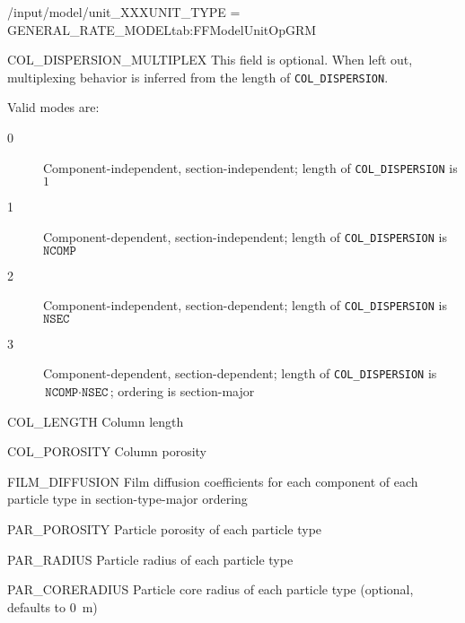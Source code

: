 \begin{condsubgroup}{/input/model/unit\_XXX}{UNIT\_TYPE = GENERAL\_RATE\_MODEL}{tab:FFModelUnitOpGRM}
\begin{dataset}[unit=--,type=int,range={$\{0, \dots, 3 \}$},length={1}]{COL\_DISPERSION\_MULTIPLEX}
    This field is optional.
    When left out, multiplexing behavior is inferred from the length of \texttt{COL\_DISPERSION}.

    Valid modes are:
    \begin{description}
      \item[0] Component-independent, section-independent; length of \texttt{COL\_DISPERSION} is $1$
      \item[1] Component-dependent, section-independent; length of \texttt{COL\_DISPERSION} is $\texttt{NCOMP}$
      \item[2] Component-independent, section-dependent; length of \texttt{COL\_DISPERSION} is $\texttt{NSEC}$
      \item[3] Component-dependent, section-dependent; length of \texttt{COL\_DISPERSION} is $\texttt{NCOMP} \cdot \texttt{NSEC}$; ordering is section-major
    \end{description}\vspace{-\baselineskip}
  \end{dataset}
  \begin{dataset}[unit=\si{\metre},type=double,range={$> 0$},length={1}]{COL\_LENGTH}
    Column length
  \end{dataset}
  \begin{dataset}[unit=--,type=double,range={$(0,1]$},length={1}]{COL\_POROSITY}
    Column porosity
  \end{dataset}
  \begin{dataset}[unit=\si{\metre\per\second},type=double,range={$\geq 0$},length={$\texttt{NPARTYPE} \cdot \texttt{NCOMP}$ / $\texttt{NPARTYPE} \cdot \texttt{NCOMP} \cdot \texttt{NSEC}$}]{FILM\_DIFFUSION}
    Film diffusion coefficients for each component of each particle type in section-type-major ordering
  \end{dataset}
  \begin{dataset}[unit=--,type=double,range={$(0,1]$},length={\texttt{NPARTYPE}}]{PAR\_POROSITY}
    Particle porosity of each particle type
  \end{dataset}
  \begin{dataset}[unit=\si{\metre},type=double,range={$>0$},length={\texttt{NPARTYPE}}]{PAR\_RADIUS}
    Particle radius of each particle type
  \end{dataset}
  \begin{dataset}[unit=\si{\metre},type=double,range={$[0, \texttt{PAR\_RADIUS})$},length={\texttt{NPARTYPE}}]{PAR\_CORERADIUS}
    Particle core radius of each particle type (optional, defaults to \SI{0}{\metre})

\end{dataset}
\end{condsubgroup}
